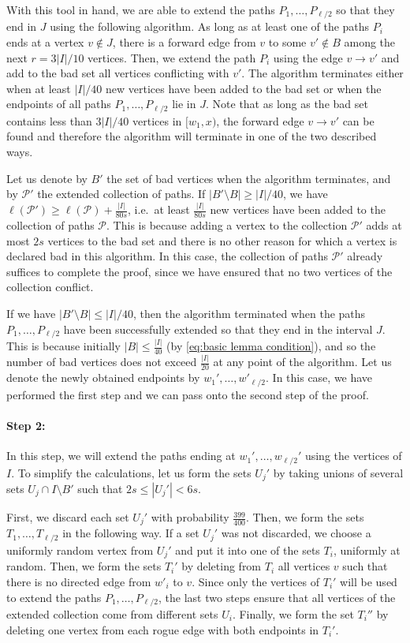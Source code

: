 \documentclass[a4paper,11pt]{article}
\makeatletter
\renewenvironment{proof}[1][\proofname] {\par\pushQED{\qed}\normalfont\topsep6\p@\@plus6\p@\relax\trivlist\item[\hskip\labelsep\bfseries#1\@addpunct{.}]\ignorespaces}{\popQED\endtrivlist\@endpefalse}
\theoremstyle{definition}
\def\cP{\mathcal{P}}
\makeatother
\begin{document}
\begin{proof}
With this tool in hand, we are able to extend the paths $P_1, \dots, P_{\ell/2}$ so that they end in $J$ using the following algorithm. As long as at least one of the paths $P_i$ ends at a vertex $v\notin J$, there is a forward edge from $v$ to some $v'\notin B$ among the next $r = 3|I|/10$ vertices. Then, we extend the path $P_i$ using the edge $v\to v'$ and add to the bad set all vertices conflicting with $v'$. The algorithm terminates either when at least $|I|/40$ new vertices have been added to the bad set or when the endpoints of all paths $P_1, \dots, P_{\ell/2}$ lie in $J$. Note that as long as the bad set contains less than $3|I|/40$ vertices in $[w_1, x)$, the forward edge $v\to v'$ can be found and therefore the algorithm will terminate in one of the two described ways. 

Let us denote by $B'$ the set of bad vertices when the algorithm terminates, and by $\cP'$ the extended collection of paths. If $|B'\setminus B|\geq |I|/40$, we have $\ell(\cP')\geq \ell(\cP)+\frac{|I|}{80 s}$, i.e.\ at least $\frac{|I|}{80 s}$ new vertices have been added to the collection of paths $\cP$. This is because adding a vertex to the collection $\cP'$ adds at most $2s$ vertices to the bad set and there is no other reason for which a vertex is declared bad in this algorithm. In this case, the collection of paths $\cP'$ already suffices to complete the proof, since we have ensured that no two vertices of the collection conflict.

If we have $|B'\setminus B|\leq |I|/40$, then the algorithm terminated when the paths $P_1, \dots, P_{\ell/2}$ have been successfully extended so that they end in the interval $J$.
This is because initially $|B| \leq \frac{|I|}{40}$ (by \eqref{eq:basic lemma condition}), and so the number of bad vertices does not exceed $\frac{|I|}{20}$ at any point of the algorithm.
Let us denote the newly obtained endpoints by $w_1', \dots, w'_{\ell/2}$. In this case, we have performed the first step and we can pass onto the second step of the proof.

\paragraph{Step 2:} In this step, we will extend the paths ending at $w_1', \dots, w_{\ell/2}'$ using the vertices of $I$. To simplify the calculations, let us form the sets $U_j'$ by taking unions of several sets $U_j\cap I\setminus B'$ such that $2s\leq |U_j'|< 6s$.

First, we discard each set $U_j'$ with probability $\frac{399}{400}$. Then, we form the sets $T_1, \dots, T_{\ell/2}$ in the following way. If a set $U_j'$ was not discarded, we choose a uniformly random vertex from $U_j'$ and put it into one of the sets $T_i$, uniformly at random. Then, we form the sets $T_i'$ by deleting from $T_i$ all vertices $v$ such that there is no directed edge from $w'_i$ to $v$. Since only the vertices of $T_i'$ will be used to extend the paths $P_1, \dots, P_{\ell/2}$, the last two steps ensure that all vertices of the extended collection come from different sets $U_i$.
Finally, we form the set $T_i''$ by deleting one vertex from each rogue edge with both endpoints in $T_i'$. 


\end{proof}
\end{document}
